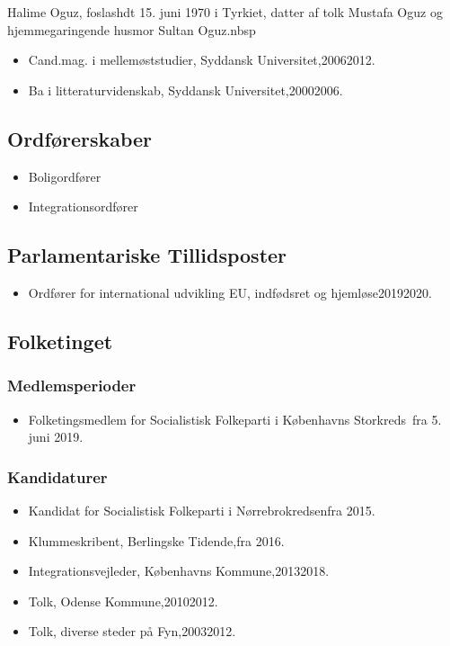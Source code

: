 \documentclass[11pt, a4paper]{awesome-cv}
\begin{document}
\makecvheader[R]
\makelettertitle
\begin{cvletter}
Halime Oguz, foslashdt 15. juni 1970 i Tyrkiet, datter af tolk Mustafa Oguz og hjemmegaringende husmor Sultan Oguz.nbsp

\begin{itemize}
\item Cand.mag. i mellemøststudier, Syddansk Universitet,20062012.
\item Ba i litteraturvidenskab, Syddansk Universitet,20002006.
\end{itemize}
\subsection*{Ordførerskaber}
\begin{itemize}
\item Boligordfører
\item Integrationsordfører
\end{itemize}
\subsection*{Parlamentariske Tillidsposter}
\begin{itemize}
\item Ordfører for international udvikling EU, indfødsret og hjemløse20192020.
\end{itemize}
\subsection*{Folketinget}
\subsubsection*{Medlemsperioder}
\begin{itemize}
\item Folketingsmedlem for Socialistisk Folkeparti i Københavns Storkreds fra 5. juni 2019.
\end{itemize}
\subsubsection*{Kandidaturer}
\begin{itemize}
\item Kandidat for Socialistisk Folkeparti i Nørrebrokredsenfra 2015.
\end{itemize}
\begin{itemize}
\item Klummeskribent, Berlingske Tidende,fra 2016.
\item Integrationsvejleder, Københavns Kommune,20132018.
\item Tolk, Odense Kommune,20102012.
\item Tolk, diverse steder på Fyn,20032012.
\end{itemize}
\end{cvletter}
\end{document}
